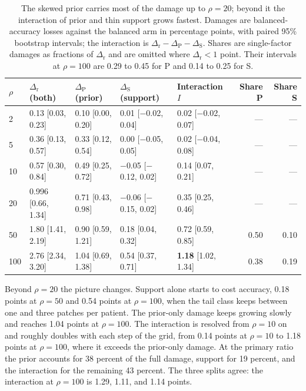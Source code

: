 \begin{table}[htbp]
\centering
\small
\setlength{\tabcolsep}{4pt}
\renewcommand{\arraystretch}{1.15}
\begin{tabular}{@{}lllllrr@{}}
\toprule
$\rho$ & $\Delta_\text{r}$ (both) & $\Delta_\text{P}$ (prior) & $\Delta_\text{S}$ (support) & Interaction $I$ & Share P & Share S \\
\midrule
2 & 0.13 [0.03, 0.23] & 0.10 [0.00, 0.20] & 0.01 [$-$0.02, 0.04] & 0.02 [$-$0.02, 0.07] & --- & --- \\
5 & 0.36 [0.13, 0.57] & 0.33 [0.12, 0.54] & 0.00 [$-$0.05, 0.05] & 0.02 [$-$0.04, 0.08] & --- & --- \\
10 & 0.57 [0.30, 0.84] & 0.49 [0.25, 0.72] & $-$0.05 [$-$0.12, 0.02] & 0.14 [0.07, 0.21] & --- & --- \\
20 & 0.996 [0.66, 1.34] & 0.71 [0.43, 0.98] & $-$0.06 [$-$0.15, 0.02] & 0.35 [0.25, 0.46] & --- & --- \\
50 & 1.80 [1.41, 2.19] & 0.90 [0.59, 1.21] & 0.18 [0.04, 0.32] & 0.72 [0.59, 0.85] & 0.50 & 0.10 \\
100 & 2.76 [2.34, 3.20] & 1.04 [0.69, 1.38] & 0.54 [0.37, 0.71] & \textbf{1.18} [1.02, 1.34] & 0.38 & 0.19 \\
\bottomrule
\end{tabular}
\caption{The skewed prior carries most of the damage up to $\rho=20$; beyond it the interaction of prior and thin support grows fastest. Damages are balanced-accuracy losses against the balanced arm in percentage points, with paired 95\% bootstrap intervals; the interaction is $\Delta_\text{r}-\Delta_\text{P}-\Delta_\text{S}$. Shares are single-factor damages as fractions of $\Delta_\text{r}$ and are omitted where $\Delta_\text{r}<1$ point. Their intervals at $\rho=100$ are 0.29 to 0.45 for P and 0.14 to 0.25 for S.}
\label{tab:decomposition}
\end{table}

\noindent Beyond $\rho=20$ the picture changes. Support alone starts to cost accuracy, 0.18 points at $\rho=50$ and 0.54 points at $\rho=100$, when the tail class keeps between one and three patches per patient. The prior-only damage keeps growing slowly and reaches 1.04 points at $\rho=100$. The interaction is resolved from $\rho=10$ on and roughly doubles with each step of the grid, from 0.14 points at $\rho=10$ to 1.18 points at $\rho=100$, where it exceeds the prior-only damage. At the primary ratio the prior accounts for 38 percent of the full damage, support for 19 percent, and the interaction for the remaining 43 percent. The three splits agree: the interaction at $\rho=100$ is 1.29, 1.11, and 1.14 points.

